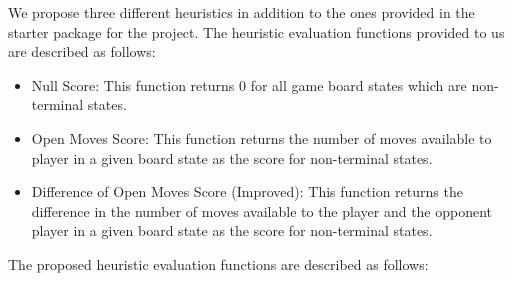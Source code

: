 \documentclass{article} %
\begin{document}
We propose three different heuristics in addition to the ones provided in the starter package for the project. The heuristic evaluation functions provided to us are described as follows:

\begin{itemize}
    \item Null Score: This function returns 0 for all game board states which are non-terminal states.
    \item Open Moves Score: This function returns the number of moves available to player in a given board state as the score for non-terminal states.
    \item Difference of Open Moves Score (Improved): This function returns the difference in the number of moves available to the player and the opponent player in a given board state as the score for non-terminal states.
\end{itemize}

The proposed heuristic evaluation functions are described as follows:
\end{document}
